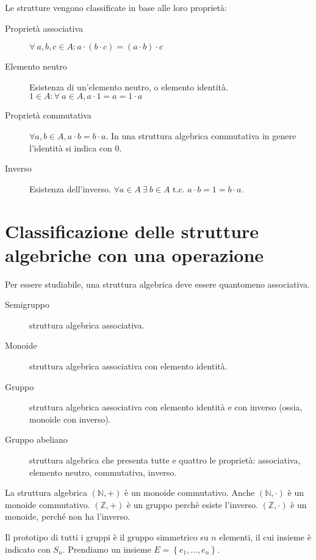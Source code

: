 Le strutture vengono classificate in base alle loro propriet\`a:
\begin{description}
    \item[Propriet\`a associativa\label{itm:strutture_associativa}] $\forall \ a, b, c \in A : a \cdot (b \cdot c) = (a \cdot b) \cdot c$
    \item[Elemento neutro\label{itm:strutture_neutro}] Esistenza di un'elemento neutro, o elemento identit\`a. $1 \in A : \forall \ a \in A , a \cdot 1 = a = 1 \cdot a$
    \item[Propriet\`a commutativa\label{itm:strutture_commutativa}] $ \forall a, b \in A , a \cdot b = b \cdot a $. In una struttura algebrica commutativa in genere l'identit\`a si indica con 0.
    \item[Inverso\label{itm:strutture_inverso}] Esistenza dell'inverso. $ \forall a \in A \ \exists \ b \in A $ t.c. $a \cdot b = 1 = b \cdot a $.
\end{description}

\section{Classificazione delle strutture algebriche con una operazione}

Per essere studiabile, una struttura algebrica deve essere quantomeno associativa.

\begin{description}
    \item[Semigruppo] struttura algebrica associativa.
    \item[Monoide] struttura algebrica associativa con elemento identit\`a.
    \item[Gruppo] struttura algebrica associativa con elemento identit\`a e con inverso (ossia, monoide con inverso).
    \item[Gruppo abeliano] struttura algebrica che presenta tutte e quattro le propriet\`a: associativa, elemento neutro, commutativa, inverso.
\end{description}

La struttura algebrica $\left( \mathbb{N}, + \right)$ \`e un monoide commutativo. Anche $\left( \mathbb{N}, \cdot \right)$ \`e un monoide commutativo. $\left( \mathbb{Z}, + \right)$ \`e un gruppo perch\`e esiste l'inverso. $\left( \mathbb{Z}, \cdot \right)$ \`e un monoide, perch\'e non ha l'inverso.

Il prototipo di tutti i gruppi \`e il gruppo simmetrico su $n$ elementi, il cui insieme \`e indicato con $S_n$. Prendiamo un insieme $E = \left\{ e_1, \dots, e_n \right\}$.

